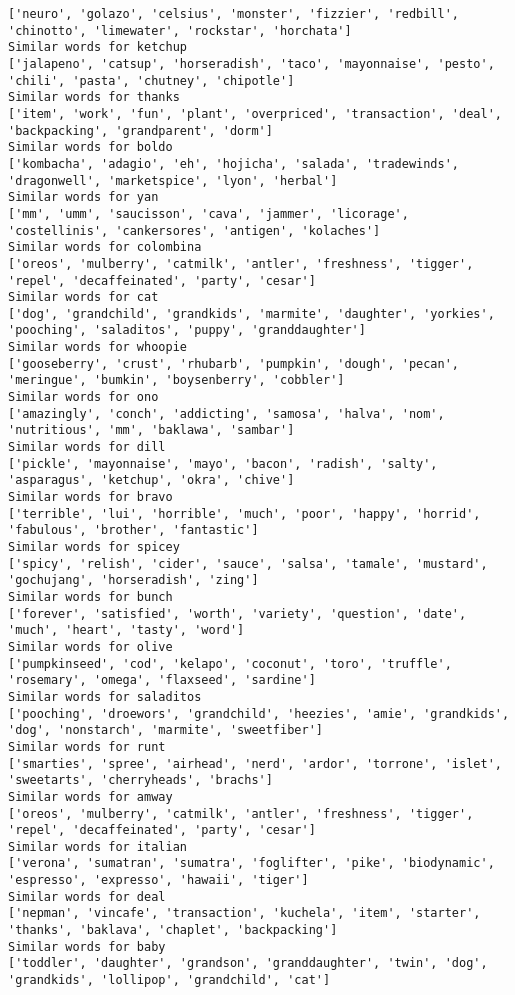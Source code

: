 \documentclass[11pt]{article}
\begin{document}
\begin{Verbatim}[commandchars=\\\{\}]
['neuro', 'golazo', 'celsius', 'monster', 'fizzier', 'redbill', 'chinotto', 'limewater', 'rockstar', 'horchata']
Similar words for ketchup
['jalapeno', 'catsup', 'horseradish', 'taco', 'mayonnaise', 'pesto', 'chili', 'pasta', 'chutney', 'chipotle']
Similar words for thanks
['item', 'work', 'fun', 'plant', 'overpriced', 'transaction', 'deal', 'backpacking', 'grandparent', 'dorm']
Similar words for boldo
['kombacha', 'adagio', 'eh', 'hojicha', 'salada', 'tradewinds', 'dragonwell', 'marketspice', 'lyon', 'herbal']
Similar words for yan
['mm', 'umm', 'saucisson', 'cava', 'jammer', 'licorage', 'costellinis', 'cankersores', 'antigen', 'kolaches']
Similar words for colombina
['oreos', 'mulberry', 'catmilk', 'antler', 'freshness', 'tigger', 'repel', 'decaffeinated', 'party', 'cesar']
Similar words for cat
['dog', 'grandchild', 'grandkids', 'marmite', 'daughter', 'yorkies', 'pooching', 'saladitos', 'puppy', 'granddaughter']
Similar words for whoopie
['gooseberry', 'crust', 'rhubarb', 'pumpkin', 'dough', 'pecan', 'meringue', 'bumkin', 'boysenberry', 'cobbler']
Similar words for ono
['amazingly', 'conch', 'addicting', 'samosa', 'halva', 'nom', 'nutritious', 'mm', 'baklawa', 'sambar']
Similar words for dill
['pickle', 'mayonnaise', 'mayo', 'bacon', 'radish', 'salty', 'asparagus', 'ketchup', 'okra', 'chive']
Similar words for bravo
['terrible', 'lui', 'horrible', 'much', 'poor', 'happy', 'horrid', 'fabulous', 'brother', 'fantastic']
Similar words for spicey
['spicy', 'relish', 'cider', 'sauce', 'salsa', 'tamale', 'mustard', 'gochujang', 'horseradish', 'zing']
Similar words for bunch
['forever', 'satisfied', 'worth', 'variety', 'question', 'date', 'much', 'heart', 'tasty', 'word']
Similar words for olive
['pumpkinseed', 'cod', 'kelapo', 'coconut', 'toro', 'truffle', 'rosemary', 'omega', 'flaxseed', 'sardine']
Similar words for saladitos
['pooching', 'droewors', 'grandchild', 'heezies', 'amie', 'grandkids', 'dog', 'nonstarch', 'marmite', 'sweetfiber']
Similar words for runt
['smarties', 'spree', 'airhead', 'nerd', 'ardor', 'torrone', 'islet', 'sweetarts', 'cherryheads', 'brachs']
Similar words for amway
['oreos', 'mulberry', 'catmilk', 'antler', 'freshness', 'tigger', 'repel', 'decaffeinated', 'party', 'cesar']
Similar words for italian
['verona', 'sumatran', 'sumatra', 'foglifter', 'pike', 'biodynamic', 'espresso', 'expresso', 'hawaii', 'tiger']
Similar words for deal
['nepman', 'vincafe', 'transaction', 'kuchela', 'item', 'starter', 'thanks', 'baklava', 'chaplet', 'backpacking']
Similar words for baby
['toddler', 'daughter', 'grandson', 'granddaughter', 'twin', 'dog', 'grandkids', 'lollipop', 'grandchild', 'cat']

\end{Verbatim}
\end{document}
